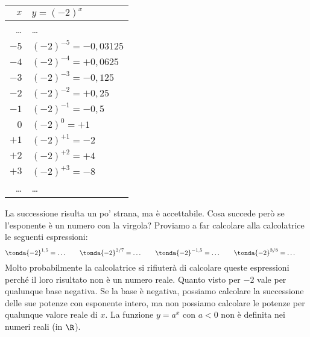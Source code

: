  \begin{minipage}[]{.48\textwidth}
 \vspace*{.6cm}
  \begin{center}
   \begin{tabular}{r|l}
    \(x\)   & \(y=(-2)^x\) \\
    \hline
    \dots & \dots \\
    \(-5\) & \((-2)^{-5} = -0,03125\) \\
    \(-4\) & \((-2)^{-4} = +0,0625\) \\
    \(-3\) & \((-2)^{-3} = -0,125\) \\
    \(-2\) & \((-2)^{-2} = +0,25\) \\
    \(-1\) & \((-2)^{-1} = -0,5\) \\
    \(0\) & \((-2)^{0} = +1\) \\
    \(+1\) & \((-2)^{+1} = -2\) \\
    \(+2\) & \((-2)^{+2} = +4\) \\
    \(+3\) & \((-2)^{+3} = -8\) \\
    \dots & \dots \\
   \end{tabular}
 \vspace*{.6cm} \label{tab:potmenodue0}
  \end{center}
 \end{minipage}
\begin{minipage}[]{.48\textwidth}
\begin{center}
\begin{inaccessibleblock}
  \puntimenodue
\end{inaccessibleblock}
\end{center}
\end{minipage}
La successione risulta un po' strana, ma è accettabile. Cosa succede però 
se l'esponente è un numero con la virgola? 
Proviamo a far calcolare alla calcolatrice le seguenti espressioni:
\[\tonda{-2}^{1,5}= \dots \qquad \tonda{-2}^{2/7}= \dots \qquad 
 \tonda{-2}^{-1,5}= \dots \qquad \tonda{-2}^{3/8}= \dots \qquad 
\]
Molto probabilmente la calcolatrice si rifiuterà di calcolare queste 
espressioni perché il loro risultato non è un numero reale. 
Quanto visto per \(-2\) vale per qualunque base negativa.
Se la base è negativa, possiamo calcolare la successione delle sue 
potenze con esponente intero, ma non possiamo calcolare le potenze per 
qualunque valore reale di \(x\). 
La funzione \(y=a^x \text{ con } a<0\) non è definita nei numeri reali 
(in \(\R\)).

